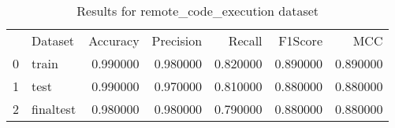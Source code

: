 \begin{table}
\caption{Results for remote_code_execution dataset}
\begin{tabular}{llrrrrr}
 & Dataset & Accuracy & Precision & Recall & F1Score & MCC \\
0 & train & 0.990000 & 0.980000 & 0.820000 & 0.890000 & 0.890000 \\
1 & test & 0.990000 & 0.970000 & 0.810000 & 0.880000 & 0.880000 \\
2 & finaltest & 0.980000 & 0.980000 & 0.790000 & 0.880000 & 0.880000 \\
\end{tabular}
\end{table}

